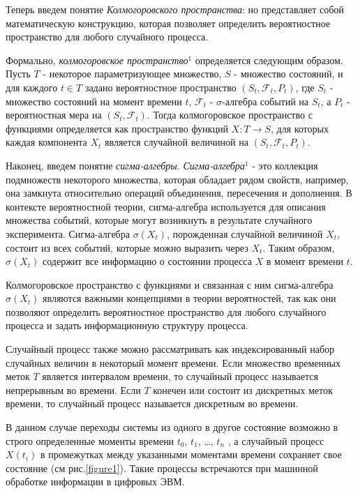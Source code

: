 \documentclass[12pt]{article}
\begin{document}
Теперь введем понятие \textit{Колмогоровского пространства}: но представляет собой математическую конструкцию, которая позволяет определить вероятностное пространство для любого случайного процесса.

Формально, \textit{колмогоровское пространство$^1$} определяется следующим образом. Пусть $T$ - некоторое параметризующее множество, $S$ - множество состояний, и для каждого $t \in T$ задано вероятностное пространство $(S_t, \mathcal{F}_t, P_t)$, где $S_t$ - множество состояний на момент времени $t$, $\mathcal{F}_t$ - $\sigma$-алгебра событий на $S_t$, а $P_t$ - вероятностная мера на $(S_t, \mathcal{F}_t)$. Тогда колмогоровское пространство с функциями определяется как пространство функций $X: T \to S$, для которых каждая компонента $X_t$ является случайной величиной на $(S_t, \mathcal{F}_t, P_t)$.

Наконец, введем понятие \textit{сигма-алгебры}. \textit{Сигма-алгебра$^1$} - это коллекция подмножеств некоторого множества, которая обладает рядом свойств, например, она замкнута относительно операций объединения, пересечения и дополнения. В контексте вероятностной теории, сигма-алгебра используется для описания множества событий, которые могут возникнуть в результате случайного эксперимента. Сигма-алгебра $\sigma(X_t)$, порожденная случайной величиной $X_t$, состоит из всех событий, которые можно выразить через $X_t$. Таким образом, $\sigma(X_t)$ содержит все информацию о состоянии процесса $X$ в момент времени $t$.

Колмогоровское пространство с функциями и связанная с ним сигма-алгебра $\sigma(X_t)$ являются важными концепциями в теории вероятностей, так как они позволяют определить вероятностное пространство для любого случайного процесса и задать информационную структуру процесса. 

Случайный процесс также можно рассматривать как индексированный набор случайных величин в некоторый момент времени. Если множество временных меток $T$ является интервалом времени, то случайный процесс называется непрерывным во времени. Если $T$ конечен или состоит из дискретных меток времени, то случайный процесс называется дискретным во времени.

В данном случае переходы системы из одного в другое состояние возможно в строго определенные моменты времени ${t_0}$, ${t_1}$, …, ${t_n}$ , а случайный
процесс $X(t_i)$ в промежутках между указанными моментами времени сохраняет свое состояние (см рис.\ref{figure1}). Такие процессы встречаются при машинной обработке информации в цифровых ЭВМ. 
\end{document}
